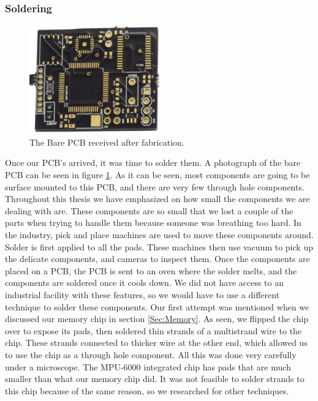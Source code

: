 \subsubsection{Soldering}
\label{Sec:Soldering}
\begin{figure}
\begin{center}
\includegraphics[width=0.5\textwidth]{images/BarePCB.jpg}
\caption{The Bare PCB received after fabrication.}
\label{Fig:PCBBare}
\end{center}
\end{figure}
Once our PCB's arrived, it was time to solder them.
A photograph of the bare PCB can be seen in figure \ref{Fig:PCBBare}.
As it can be seen,
most components are going to be surface mounted to this PCB,
and there are very few through hole components.
Throughout this thesis we have emphasized on how small the components we are dealing with are.
These components are so small that we lost a couple of the parts when trying to handle them because someone was breathing too hard.
In the industry,
pick and place machines are used to move these components around.
Solder is first applied to all the pads.
These machines then use vacuum to pick up the delicate components,
and cameras to inspect them. 
Once the components are placed on a PCB,
the PCB is sent to an oven where the solder melts,
and the components are soldered once it cools down.
We did not have access to an industrial facility with these features,
so we would have to use a different technique to solder these components.
Our first attempt was mentioned when we discussed our memory chip in section \ref{Sec:Memory}.
As seen, we flipped the chip over to expose its pads,
then soldered thin strands of a multistrand wire to the chip.
These strands connected to thicker wire at the other end,
which allowed us to use the chip as a through hole component.
All this was done very carefully under a microscope.
The MPU-6000 integrated chip has pads that are much smaller than what our memory chip did.
It was not feasible to solder strands to this chip because of the same reason,
so we researched for other techniques.

